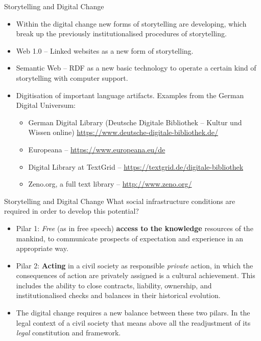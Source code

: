 \documentclass{beamer}
\begin{document}
\begin{frame}{Storytelling and Digital Change}
\begin{itemize}
\item Within the digital change new forms of storytelling are developing,
  which break up the previously institutionalised procedures of storytelling.
\item Web 1.0 -- Linked websites as a new form of storytelling.
\item Semantic Web -- RDF as a new basic technology to operate a certain kind
  of storytelling with computer support.
\item Digitisation of important language artifacts. Examples from the German
  Digital Universum:
  \begin{itemize}
  \item German Digital Library (Deutsche Digitale Bibliothek – Kultur und
    Wissen online) \url{https://www.deutsche-digitale-bibliothek.de/} 
  \item Europeana – \url{https://www.europeana.eu/de}
  \item Digital Library at TextGrid –
    \url{https://textgrid.de/digitale-bibliothek}
  \item Zeno.org, a full text library – \url{http://www.zeno.org/}
  \end{itemize}
\end{itemize}\vspace*{2em}
\end{frame}

\begin{frame}{Storytelling and Digital Change}
What social infrastructure conditions are required in order to develop this
potential?
\begin{itemize}
\item Pilar 1: \emph{Free} (as in free speech) \textbf{access to the
  knowledge} resources of the mankind, to communicate prospects of expectation
  and experience in an appropriate way.
\item Pilar 2: \textbf{Acting} in a civil society as responsible
  \emph{private} action, in which the consequences of action are privately
  assigned is a cultural achievement. This includes the ability to close
  contracts, liability, ownership, and institutionalised checks and balances
  in their historical evolution.
\item The digital change requires a new balance between these two pilars. In
  the legal context of a civil society that means above all the readjustment
  of its \emph{legal} constitution and framework.
\end{itemize}
\end{frame}
\end{document}
